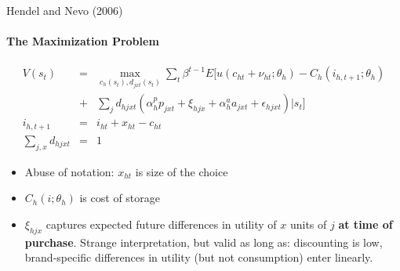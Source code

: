 \documentclass[11pt,aspectratio=169]{beamer}
\begin{document}
\begin{frame}{Hendel and Nevo (2006)}
\framesubtitle{The Maximization Problem}
\vspace{-0.3cm}
\footnotesize
\begin{eqnarray*}
V(s_t)&=& \max_{c_h(s_t),d_{jxt}(s_t)} \sum_t \beta^{t-1} E[ u(c_{ht}+\nu_{ht}; \theta_h) - C_h(i_{h,t+1};\theta_h) \\
&+&\sum_j d_{hjxt} (\alpha_h^p p_{jxt} + \xi_{hjx} + \alpha_h^a a_{jxt} + \epsilon_{hjxt} )| s_t]\\
i_{h,t+1} &=& i_{ht} + x_{ht} - c_{ht}\\
\sum_{j,x} d_{hjxt} &=& 1
\end{eqnarray*}
\vspace{-0.3cm}
\begin{itemize}
\item[$-$] Abuse of notation: $x_{ht}$ is size of the choice
\item[$-$] $C_h(i; \theta_h)$ is cost of storage
\item[$-$] $\xi_{hjx}$ captures expected future differences in utility of $x$ units of $j$ \textbf{at time of purchase}. Strange interpretation, but valid as long as: discounting is low, brand-specific differences in utility (but not consumption) enter linearly.
\end{itemize}
\end{frame}
\end{document}
